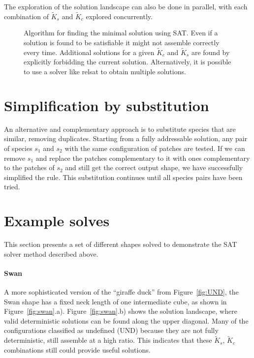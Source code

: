 The exploration of the solution landscape can also be done in parallel, with each combination of \(\widetilde{K}_s\) and \(\widetilde{K}_c\) explored concurrently.

\begin{figure}
    \centering
    \resizebox{\textwidth}{!}{}
    \caption{Algorithm for finding the minimal solution using SAT. Even if a solution is found to be satisfiable it might not assemble correctly every time. Additional solutions for a given \(\widetilde{K}_c\) and \(\widetilde{K}_s\) are found by explicitly forbidding the current solution. Alternatively, it is possible to use a solver like relsat to obtain multiple solutions. }
    \label{fig:sat_alg}
\end{figure}

\section{Simplification by substitution}
\label{sec:substitution_solving}
An alternative and complementary approach is to substitute species that are similar, removing duplicates. Starting from a fully addressable solution, any pair of species \(s_1\) and \(s_2\) with the same configuration of patches are tested. If we can remove \(s_1\) and replace the patches complementary to it with ones complementary to the patches of \(s_2\) and still get the correct output shape, we have successfully simplified the rule. This substitution continues until all species pairs have been tried.

\section{Example solves}
\label{sec:example_solves}
This section presents a set of different shapes solved to demonstrate the SAT solver method described above.

\paragraph{Swan} A more sophisticated version of the ``giraffe duck'' from Figure~\ref{fig:UND}, the Swan shape has a fixed neck length of one intermediate cube, as shown in Figure~\ref{fig:swan}.a). Figure~\ref{fig:swan}.b) shows the solution landscape, where valid deterministic solutions can be found along the upper diagonal. Many of the configurations classified as undefined (UND) because they are not fully deterministic, still assemble at a high ratio. This indicates that these \(\widetilde{K}_s\), \(\widetilde{K}_c\) combinations still could provide useful solutions.

